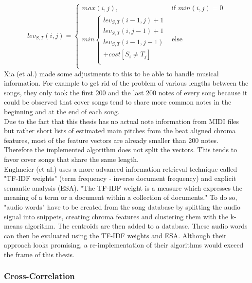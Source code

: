 \begin{equation} \label{eq:tr1}
lev_{S,T}(i, j) = \begin{cases}
max(i, j), &\text{if } min(i, j) = 0\\
min \begin{cases}
lev_{S,T}(i-1, j) + 1\\
lev_{S,T}(i, j-1) + 1\\
lev_{S,T}(i-1, j-1)\\
+cost[S_i \neq T_j]\\
\end{cases} &\text{else} \\
\end{cases}
\end{equation}
Xia (et al.) made some adjustments to this to be able to handle musical information.\cite[pp. 7ff]{chroma4} For example to get rid of the problem of various lengths between the songs, they only took the first 200 and the last 200 notes of every song because it could be observed that cover songs tend to share more common notes in the beginning and at the end of each song.\\
Due to the fact that this thesis has no actual note information from MIDI files but rather short lists of estimated main pitches from the beat aligned chroma features, most of the feature vectors are already smaller than 200 notes. Therefore the implemented algorithm does not split the vectors. This tends to favor cover songs that share the same length. 
\ \\
Englmeier (et al.) uses a more advanced information retrieval technique called "TF-IDF weights" (term frequency - inverse document frequency) and explicit semantic analysis (ESA). "The TF-IDF weight is a measure which expresses the meaning of a term or a document within a collection of documents." \cite[p. 186]{chroma1}
To do so, "audio words" have to be created from the song database by splitting the audio signal into snippets, creating chroma features and clustering them with the k-means algorithm. The centroids are then added to a database. These audio words can then be evaluated using the TF-IDF weights and ESA.
Although their approach looks promising, a re-implementation of their algorithms would exceed the frame of this thesis.

\subsubsection{Cross-Correlation}\label{crosscorrsec}

